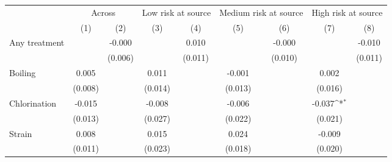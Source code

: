 {
\def\sym#1{\ifmmode^{#1}\else\(^{#1}\)\fi}
\begin{tabular}{l*{8}{c}}
\hline\hline
                    &\multicolumn{2}{c}{Across}                 &\multicolumn{2}{c}{Low risk at source}     &\multicolumn{2}{c}{Medium risk at source}  &\multicolumn{2}{c}{High risk at source}    \\\cmidrule(lr){2-3}\cmidrule(lr){4-5}\cmidrule(lr){6-7}\cmidrule(lr){8-9}
                    &\multicolumn{1}{c}{(1)}         &\multicolumn{1}{c}{(2)}         &\multicolumn{1}{c}{(3)}         &\multicolumn{1}{c}{(4)}         &\multicolumn{1}{c}{(5)}         &\multicolumn{1}{c}{(6)}         &\multicolumn{1}{c}{(7)}         &\multicolumn{1}{c}{(8)}         \\
\hline
Any treatment &                     &      -0.000         &                     &       0.010         &                     &      -0.000         &                     &      -0.010         \\
                    &                     &     (0.006)         &                     &     (0.011)         &                     &     (0.010)         &                     &     (0.011)         \\
Boiling             &       0.005         &                     &       0.011         &                     &      -0.001         &                     &       0.002         &                     \\
                    &     (0.008)         &                     &     (0.014)         &                     &     (0.013)         &                     &     (0.016)         &                     \\
Chlorination        &      -0.015         &                     &      -0.008         &                     &      -0.006         &                     &      -0.037\sym{*}  &                     \\
                    &     (0.013)         &                     &     (0.027)         &                     &     (0.022)         &                     &     (0.021)         &                     \\
Strain              &       0.008         &                     &       0.015         &                     &       0.024         &                     &      -0.009         &                     \\
                    &     (0.011)         &                     &     (0.023)         &                     &     (0.018)         &                     &     (0.020)         &                     \\

\end{tabular}}
